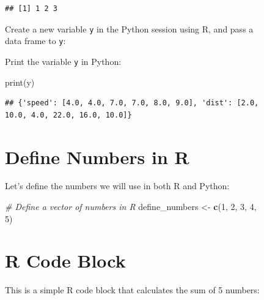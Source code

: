 \documentclass[
  12 pt,
  a4paper,
]{book}
\newenvironment{Shaded}{\begin{snugshade}}{\end{snugshade}}
\newcommand{\BuiltInTok}[1]{#1}
\newcommand{\CommentTok}[1]{\textcolor[rgb]{0.56,0.35,0.01}{\textit{#1}}}
\newcommand{\DecValTok}[1]{\textcolor[rgb]{0.00,0.00,0.81}{#1}}
\newcommand{\FunctionTok}[1]{\textcolor[rgb]{0.13,0.29,0.53}{\textbf{#1}}}
\newcommand{\NormalTok}[1]{#1}
\newcommand{\OtherTok}[1]{\textcolor[rgb]{0.56,0.35,0.01}{#1}}
\newcommand{\SpecialCharTok}[1]{\textcolor[rgb]{0.81,0.36,0.00}{\textbf{#1}}}
\numberwithin{equation}{section}
\theoremstyle{plain}      %
\theoremstyle{definition} %
\theoremstyle{remark}     %
\theoremstyle{note}         %
\begin{document}
\begin{figure}
\begin{verbatim}
## [1] 1 2 3
\end{verbatim}

Create a new variable \texttt{y} in the Python session using R, and pass
a data frame to \texttt{y}:

\begin{Shaded}
\end{Shaded}

Print the variable \texttt{y} in Python:

\begin{Shaded}
\begin{Highlighting}[]
\BuiltInTok{print}\NormalTok{(y)}
\end{Highlighting}
\end{Shaded}

\begin{verbatim}
## {'speed': [4.0, 4.0, 7.0, 7.0, 8.0, 9.0], 'dist': [2.0, 10.0, 4.0, 22.0, 16.0, 10.0]}
\end{verbatim}

\newpage

\hypertarget{define-numbers-in-r}{%
\section{Define Numbers in R}\label{define-numbers-in-r}}

Let's define the numbers we will use in both R and Python:

\begin{Shaded}
\begin{Highlighting}[]
\CommentTok{\# Define a vector of numbers in R}
\NormalTok{define\_numbers }\OtherTok{\textless{}{-}} \FunctionTok{c}\NormalTok{(}\DecValTok{1}\NormalTok{, }\DecValTok{2}\NormalTok{, }\DecValTok{3}\NormalTok{, }\DecValTok{4}\NormalTok{, }\DecValTok{5}\NormalTok{)}
\end{Highlighting}
\end{Shaded}

\hypertarget{r-code-block}{%
\section{R Code Block}\label{r-code-block}}

This is a simple R code block that calculates the sum of 5 numbers:


\end{figure}
\end{document}
